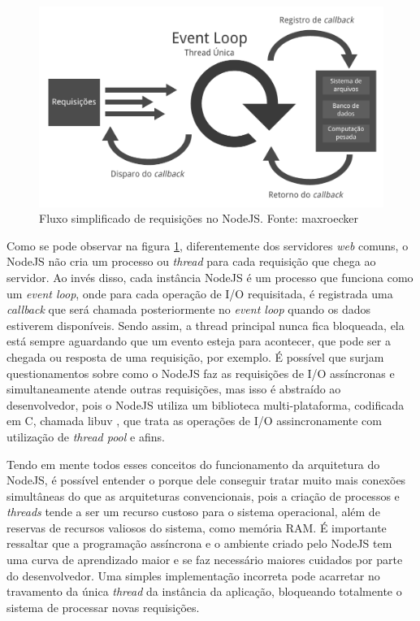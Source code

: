 \begin{figure}[!htb]
	\centering
	\includegraphics[scale=0.55]{imagens/node-eventloop.png}
	\caption{\small Fluxo simplificado de requisições no NodeJS. Fonte: maxroecker \cite{img-eventloop}}
	\label{fig:node-eventloop}
\end{figure}

Como se pode observar na figura \ref{fig:node-eventloop}, diferentemente dos servidores \textit{web} comuns, o NodeJS não cria um processo ou \textit{thread} para cada requisição que chega ao servidor. Ao invés disso, cada instância NodeJS é um processo que funciona como um \textit{event loop}, onde para cada operação de I/O requisitada, é registrada uma \textit{callback} que será chamada posteriormente no \textit{event loop} quando os dados estiverem disponíveis. Sendo assim, a thread principal nunca fica bloqueada, ela está sempre aguardando que um evento esteja para acontecer, que pode ser a chegada ou resposta de uma requisição, por exemplo. É possível que surjam questionamentos sobre como o NodeJS faz as requisições de I/O assíncronas e simultaneamente atende outras requisições, mas isso é abstraído ao desenvolvedor, pois o NodeJS utiliza um biblioteca multi-plataforma, codificada em C, chamada libuv \cite{libuv}, que trata as operações de I/O assincronamente com utilização de \textit{thread pool} e afins.

Tendo em mente todos esses conceitos do funcionamento da arquitetura do NodeJS, é possível entender o porque dele conseguir tratar muito mais conexões simultâneas do que as arquiteturas convencionais, pois a criação de processos e \textit{threads} tende a ser um recurso custoso para o sistema operacional, além de reservas de recursos valiosos do sistema, como memória RAM. É importante ressaltar que a programação assíncrona e o ambiente criado pelo NodeJS tem uma curva de aprendizado maior e se faz necessário maiores cuidados por parte do desenvolvedor. Uma simples implementação incorreta pode acarretar no travamento da única \textit{thread} da instância da aplicação, bloqueando totalmente o sistema de processar novas requisições. 

